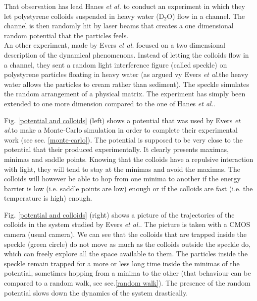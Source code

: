 \documentclass[a4paper,12pt]{article}
\newcommand{\jline}{\vspace{10pt}}
\newcommand{\etal}{\textit{et al.}}
\begin{document}
That observation has lead Hanes \etal \cite{Hanes2012} to conduct an experiment in which they let polystyrene colloids suspended in heavy water
(D$_2$O) flow in a channel. The channel is then randomly hit by laser beams that creates a one dimensional random potential that the particles 
feels.\\
An other experiment, made by Evers \etal \cite{Evers2013} focused on a two dimensional description of the dynamical phenomenons. Instead of
letting the colloids flow in a channel, they sent a random light interference figure (called speckle) on polystyrene particles floating in heavy
water (as argued vy Evers \etal the heavy water allows the particles to cream rather than sediment). The speckle simulates the random arrangement
of a physical matrix. The experiment has simply been extended to one more dimension compared to the one of Hanes \etal.\jline

Fig. \ref{potential and colloids} (left) shows a potential that was used by Evers \etal to make a Monte-Carlo simulation in order to complete their
experimental work (see sec. \ref{monte-carlo}). The potential is supposed to be very close to the potential that their produced experimentally. It
clearly  presents maximas, minimas and saddle points. Knowing that the colloids have a repulsive interaction with light, they will tend to stay at
the minimas and avoid the maximas. The colloids will however be able to hop from one minima to another if the energy barrier is low (i.e. saddle
points are low) enough or if the colloids are fast (i.e. the temperature is high) enough.\jline

Fig. \ref{potential and colloids} (right) shows a picture of the trajectories of the colloids in the system studied by Evers \etal. The picture is
taken with a CMOS camera (usual camera). We can see that the colloids that are trapped inside the speckle (green circle) do not move as much as the
colloids outside the speckle do, which can freely explore all the space available to them. The particles inside the speckle remain trapped for a 
more or less long time inside the minimas of the potential, sometimes hopping from a minima to the other (that behaviour can be compared to a 
random walk, see sec.\ref{random walk}). The presence of the random potential slows down the dynamics of the system drastically.\jline
\end{document}
